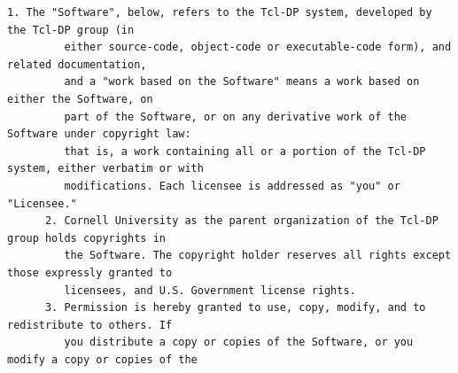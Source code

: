 \begin{lstlisting}[basicstyle=\ttfamily\footnotesize,breaklines=true]
      1. The "Software", below, refers to the Tcl-DP system, developed by the Tcl-DP group (in
         either source-code, object-code or executable-code form), and related documentation,
         and a "work based on the Software" means a work based on either the Software, on
         part of the Software, or on any derivative work of the Software under copyright law:
         that is, a work containing all or a portion of the Tcl-DP system, either verbatim or with
         modifications. Each licensee is addressed as "you" or "Licensee."
      2. Cornell University as the parent organization of the Tcl-DP group holds copyrights in
         the Software. The copyright holder reserves all rights except those expressly granted to
         licensees, and U.S. Government license rights.
      3. Permission is hereby granted to use, copy, modify, and to redistribute to others. If
         you distribute a copy or copies of the Software, or you modify a copy or copies of the





\end{lstlisting}
